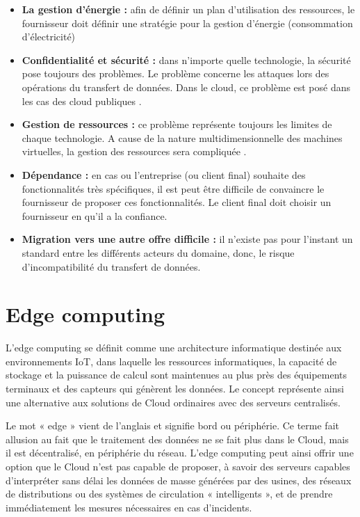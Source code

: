 \begin{itemize}
    \item \textbf{La gestion d’énergie :} afin de définir un plan d’utilisation des ressources, le fournisseur doit définir une stratégie pour la gestion d’énergie (consommation d’électricité) \cite{c87}
\item \textbf{Confidentialité et sécurité :} dans n’importe quelle technologie, la sécurité pose toujours des problèmes. Le problème concerne les attaques lors des opérations du transfert de données. Dans le cloud, ce problème est posé dans les cas des cloud publiques \cite{c87}.
\item \textbf{Gestion de ressources :} ce problème représente toujours les limites de chaque technologie. A cause de la nature multidimensionnelle des machines virtuelles, la gestion des ressources sera compliquée .
\item \textbf{Dépendance :} en cas ou l’entreprise (ou client final) souhaite des fonctionnalités très spécifiques, il est peut être difficile de convaincre le fournisseur de proposer ces fonctionnalités. Le client final doit choisir un fournisseur en qu’il a la confiance.
\item \textbf{Migration vers une autre offre difficile :} il n’existe pas pour l’instant un standard entre les différents acteurs du domaine, donc, le risque d’incompatibilité du transfert de données.

\end{itemize}

\section{Edge computing}
L’edge computing se définit comme une architecture informatique destinée aux environnements IoT, dans laquelle les ressources informatiques, la capacité de stockage et la puissance de calcul sont maintenues au plus près des équipements terminaux et des capteurs qui génèrent les données. Le concept représente ainsi une alternative aux solutions de Cloud ordinaires avec des serveurs centralisés.

Le mot « edge » vient de l’anglais et signifie bord ou périphérie. Ce terme fait allusion au fait que le traitement des données ne se fait plus dans le Cloud, mais il est décentralisé, en périphérie du réseau. L’edge computing peut ainsi offrir une option que le Cloud n’est pas capable de proposer, à savoir des serveurs capables d’interpréter sans délai les données de masse générées par des usines, des réseaux de distributions ou des systèmes de circulation « intelligents », et de prendre immédiatement les mesures nécessaires en cas d’incidents.
